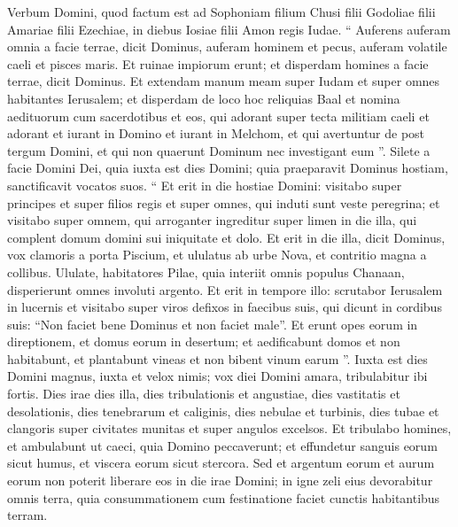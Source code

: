 \begin{biblechapter}
 \verse Verbum Domini, quod factum est ad Sophoniam filium Chusi filii Godoliae filii Amariae filii Ezechiae, in diebus Iosiae filii Amon regis Iudae.
 \verse “ Auferens auferam omnia
 a facie terrae,
 dicit Dominus,
 \verse auferam hominem et pecus,
 auferam volatile caeli
 et pisces maris.
 Et ruinae impiorum erunt;
 et disperdam homines a facie terrae,
 dicit Dominus.
 \verse Et extendam manum meam super Iudam
 et super omnes habitantes Ierusalem;
 et disperdam de loco hoc reliquias Baal
 et nomina aedituorum cum sacerdotibus
 \verse et eos, qui adorant super tecta
 militiam caeli
 et adorant et iurant in Domino
 et iurant in Melchom,
 \verse et qui avertuntur de post tergum Domini,
 et qui non quaerunt Dominum nec investigant eum ”.
 \verse Silete a facie Domini Dei,
 quia iuxta est dies Domini;
 quia praeparavit Dominus hostiam,
 sanctificavit vocatos suos.
 \verse “ Et erit in die hostiae Domini:
 visitabo super principes
 et super filios regis
 et super omnes, qui induti sunt
 veste peregrina;
 \verse et visitabo super omnem,
 qui arroganter ingreditur super limen in die illa,
 qui complent domum domini sui
 iniquitate et dolo.
 \verse Et erit in die illa,
 dicit Dominus,
 vox clamoris a porta Piscium,
 et ululatus ab urbe Nova,
 et contritio magna a collibus.
 \verse Ululate, habitatores Pilae,
 quia interiit omnis populus Chanaan,
 disperierunt omnes involuti argento.
 \verse Et erit in tempore illo:
 scrutabor Ierusalem in lucernis
 et visitabo super viros
 defixos in faecibus suis,
 qui dicunt in cordibus suis:
 “Non faciet bene Dominus
 et non faciet male”.
 \verse Et erunt opes eorum in direptionem,
 et domus eorum in desertum;
 et aedificabunt domos
 et non habitabunt,
 et plantabunt vineas
 et non bibent vinum earum ”.
 \verse Iuxta est dies Domini magnus,
 iuxta et velox nimis;
 vox diei Domini amara,
 tribulabitur ibi fortis.
 \verse Dies irae dies illa,
 dies tribulationis et angustiae,
 dies vastitatis et desolationis,
 dies tenebrarum et caliginis,
 dies nebulae et turbinis,
 \verse dies tubae et clangoris
 super civitates munitas
 et super angulos excelsos.
 \verse Et tribulabo homines,
 et ambulabunt ut caeci,
 quia Domino peccaverunt;
 et effundetur sanguis eorum sicut humus,
 et viscera eorum sicut stercora.
 \verse Sed et argentum eorum et aurum eorum
 non poterit liberare eos
 in die irae Domini;
 in igne zeli eius
 devorabitur omnis terra,
 quia consummationem cum festinatione faciet
 cunctis habitantibus terram.
 

\end{biblechapter}
